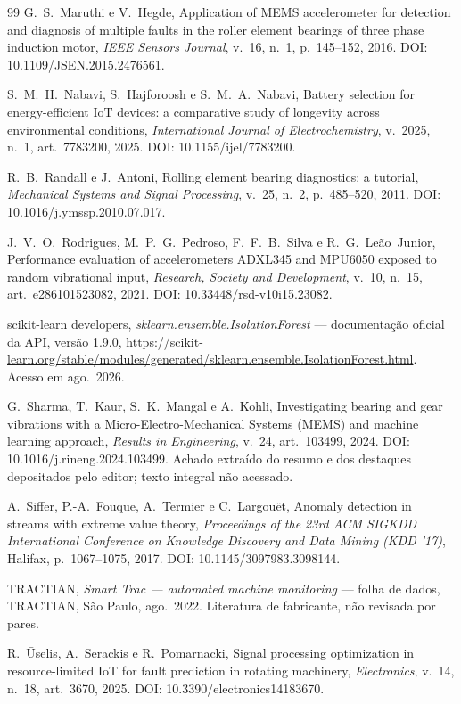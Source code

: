 \documentclass[11pt,a4paper]{article}
\begin{document}
\begin{thebibliography}{99}
G.~S.~Maruthi e V.~Hegde,
\newblock Application of MEMS accelerometer for detection and diagnosis of multiple faults in the roller element bearings of three phase induction motor,
\newblock \emph{IEEE Sensors Journal}, v.~16, n.~1, p.~145--152, 2016.
\newblock DOI: 10.1109/JSEN.2015.2476561.

S.~M.~H.~Nabavi, S.~Hajforoosh e S.~M.~A.~Nabavi,
\newblock Battery selection for energy-efficient IoT devices: a comparative study of longevity across environmental conditions,
\newblock \emph{International Journal of Electrochemistry}, v.~2025, n.~1, art.~7783200, 2025.
\newblock DOI: 10.1155/ijel/7783200.

R.~B.~Randall e J.~Antoni,
\newblock Rolling element bearing diagnostics: a tutorial,
\newblock \emph{Mechanical Systems and Signal Processing}, v.~25, n.~2, p.~485--520, 2011.
\newblock DOI: 10.1016/j.ymssp.2010.07.017.

J.~V.~O.~Rodrigues, M.~P.~G.~Pedroso, F.~F.~B.~Silva e R.~G.~Leão~Junior,
\newblock Performance evaluation of accelerometers ADXL345 and MPU6050 exposed to random vibrational input,
\newblock \emph{Research, Society and Development}, v.~10, n.~15, art.~e286101523082, 2021.
\newblock DOI: 10.33448/rsd-v10i15.23082.

scikit-learn developers,
\newblock \emph{sklearn.ensemble.IsolationForest} --- documentação oficial da API, versão 1.9.0,
\newblock \url{https://scikit-learn.org/stable/modules/generated/sklearn.ensemble.IsolationForest.html}. Acesso em ago.\ 2026.

G.~Sharma, T.~Kaur, S.~K.~Mangal e A.~Kohli,
\newblock Investigating bearing and gear vibrations with a Micro-Electro-Mechanical Systems (MEMS) and machine learning approach,
\newblock \emph{Results in Engineering}, v.~24, art.~103499, 2024.
\newblock DOI: 10.1016/j.rineng.2024.103499.
\newblock Achado extraído do resumo e dos destaques depositados pelo editor; texto integral não acessado.

A.~Siffer, P.-A.~Fouque, A.~Termier e C.~Largouët,
\newblock Anomaly detection in streams with extreme value theory,
\newblock \emph{Proceedings of the 23rd ACM SIGKDD International Conference on Knowledge Discovery and Data Mining (KDD '17)}, Halifax, p.~1067--1075, 2017.
\newblock DOI: 10.1145/3097983.3098144.

TRACTIAN,
\newblock \emph{Smart Trac --- automated machine monitoring} --- folha de dados,
\newblock TRACTIAN, São Paulo, ago.\ 2022.
\newblock Literatura de fabricante, não revisada por pares.

R.~\=Uselis, A.~Serackis e R.~Pomarnacki,
\newblock Signal processing optimization in resource-limited IoT for fault prediction in rotating machinery,
\newblock \emph{Electronics}, v.~14, n.~18, art.~3670, 2025.
\newblock DOI: 10.3390/electronics14183670.

\end{thebibliography}
\end{document}
